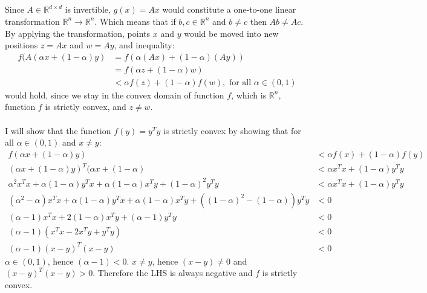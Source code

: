 \documentclass[a4paper]{article}
\begin{document}
\subsection{}
Since $A \in \mathbb{R}^{d\times d}$ is invertible, $g(x) = Ax$ would constitute
a one-to-one linear transformation $\mathbb{R}^n \rightarrow \mathbb{R}^n$.
Which means that if $b, c \in \mathbb{R}^n$ and $b \neq c$ then $Ab \neq Ac$.
By applying the transformation, points
$x$ and $y$ would be moved into new positions $z = Ax$ and $w = Ay$, and
inequality:
\[
\begin{aligned}
  f(A\left(\alpha x + (1 - \alpha) y\right)
  &=f(\alpha(A x)+(1-\alpha)(A y))\\
  &=f(\alpha z+(1-\alpha)w)\\
  &< \alpha f(z)+(1-\alpha) f(w), \text { for all } \alpha \in(0,1)
\end{aligned}
\]
would hold, since we stay in the convex domain of function $f$, which is
$\mathbb{R}^n$, function $f$ is strictly convex, and $z\neq w$.\\\\
I will show that the function $f(y) = y^Ty$ is strictly convex by showing
that for all $\alpha \in (0,1)$ and $x \neq y$:
\begin{align*}
  f(\alpha x + (1-\alpha)y) &< \alpha f(x) + (1 - \alpha) f(y)\\
  (\alpha x + (1 - \alpha) y)^T (\alpha x + (1 - \alpha)
  &<
  \alpha x^Tx + (1-\alpha) y^Ty\\
  \alpha^2 x^Tx + \alpha(1-\alpha) y^Tx + \alpha(1-\alpha) x^Ty + (1-\alpha)^2 y^Ty
  &<
  \alpha x^Tx + (1-\alpha) y^Ty\\
  (\alpha^2 - \alpha) x^Tx + \alpha(1-\alpha) y^Tx + \alpha(1-\alpha) x^Ty +
  ((1-\alpha)^2 - (1-\alpha)) y^Ty
  &<
  0\\
  (\alpha - 1) x^Tx + 2(1-\alpha) x^Ty + (\alpha - 1)y^Ty
  &< 0\\
  (\alpha - 1) (x^Tx - 2x^Ty + y^Ty)
  &< 0\\
  (\alpha - 1) (x - y)^T(x - y)
  &< 0
\end{align*}
$\alpha \in (0,1)$, hence $(\alpha - 1) < 0$. $x \neq y$, hence $(x - y) \neq 0$
and $(x - y)^T(x - y) > 0$. Therefore the LHS is always negative and $f$ is
strictly convex. \\\\
\end{document}
